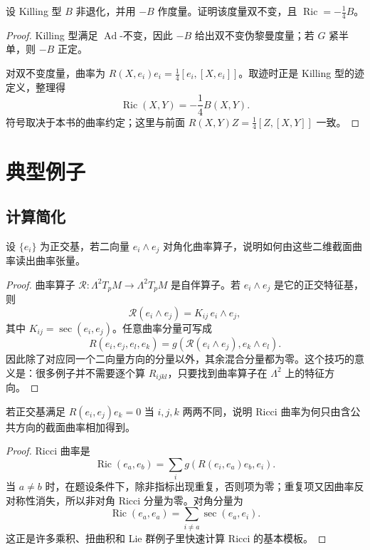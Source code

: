 \documentclass[11pt,a4paper,openany]{ctexbook}
\numberwithin{equation}{chapter}
\begin{document}
\begin{problem}
设 Killing 型 \(B\) 非退化，并用 \(-B\) 作度量。证明该度量双不变，且 \(\operatorname{Ric}=-\frac14B\)。
\end{problem}
\begin{proof}
Killing 型满足 \(\operatorname{Ad}\)-不变，因此 \(-B\) 给出双不变伪黎曼度量；若 \(G\) 紧半单，则 \(-B\) 正定。

对双不变度量，曲率为 \(R(X,e_i)e_i=\frac14[e_i,[X,e_i]]\)。取迹时正是 Killing 型的迹定义，整理得
\[
\operatorname{Ric}(X,Y)=-\frac14B(X,Y).
\]
符号取决于本书的曲率约定；这里与前面 \(R(X,Y)Z=\frac14[Z,[X,Y]]\) 一致。
\end{proof}

\chapter{典型例子}

\section{计算简化}

\begin{problem}
设 \(\{e_i\}\) 为正交基，若二向量 \(e_i\wedge e_j\) 对角化曲率算子，说明如何由这些二维截面曲率读出曲率张量。
\end{problem}
\begin{proof}
曲率算子 \(\mathcal R\colon \Lambda^2T_pM\to\Lambda^2T_pM\) 是自伴算子。若 \(e_i\wedge e_j\) 是它的正交特征基，则
\[
\mathcal R(e_i\wedge e_j)=K_{ij}\,e_i\wedge e_j,
\]
其中 \(K_{ij}=\operatorname{sec}(e_i,e_j)\)。任意曲率分量可写成
\[
R(e_i,e_j,e_l,e_k)=g(\mathcal R(e_i\wedge e_j),e_k\wedge e_l).
\]
因此除了对应同一个二向量方向的分量以外，其余混合分量都为零。这个技巧的意义是：很多例子并不需要逐个算 \(R_{ijkl}\)，只要找到曲率算子在 \(\Lambda^2\) 上的特征方向。
\end{proof}

\begin{problem}
若正交基满足 \(R(e_i,e_j)e_k=0\) 当 \(i,j,k\) 两两不同，说明 Ricci 曲率为何只由含公共方向的截面曲率相加得到。
\end{problem}
\begin{proof}
Ricci 曲率是
\[
\operatorname{Ric}(e_a,e_b)=\sum_i g(R(e_i,e_a)e_b,e_i).
\]
当 \(a\ne b\) 时，在题设条件下，除非指标出现重复，否则项为零；重复项又因曲率反对称性消失，所以非对角 Ricci 分量为零。对角分量为
\[
\operatorname{Ric}(e_a,e_a)=\sum_{i\ne a}\operatorname{sec}(e_a,e_i).
\]
这正是许多乘积、扭曲积和 Lie 群例子里快速计算 Ricci 的基本模板。
\end{proof}
\end{document}
